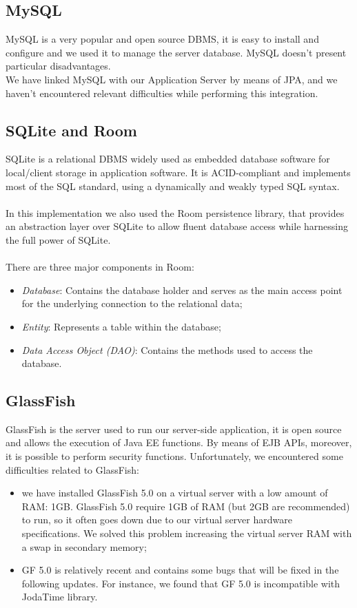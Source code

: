 \subsection{MySQL}
\label{subsec:Middleware}
MySQL is a very popular and open source DBMS, it is easy to install and configure and we used it to manage the server database. MySQL doesn't present particular disadvantages.\\
We have linked MySQL with our Application Server by means of JPA, and we haven't encountered relevant difficulties while performing this integration.

\subsection{SQLite and Room}
\label{subsec:SQLite and Room}
SQLite is a relational DBMS widely used as embedded database software for local/client storage in application software. It is ACID-compliant and implements most of the SQL standard, using a dynamically and weakly typed SQL syntax. \\\\
In this implementation we also used the Room persistence library, that provides an abstraction layer over SQLite to allow fluent database access while harnessing the full power of SQLite. \\\\
There are three major components in Room:
\begin{itemize}
\item \textit{Database}: Contains the database holder and serves as the main access point for the underlying connection to the relational data;
\item \textit{Entity}: Represents a table within the database;
\item \textit{Data Access Object (DAO)}: Contains the methods used to access the database.
\end{itemize}

\subsection{GlassFish}
\label{subsec:GlassFish}
GlassFish is the server used to run our server-side application, it is open source and allows the execution of Java EE functions. By means of EJB APIs, moreover, it is possible to perform security functions. Unfortunately, we encountered some difficulties related to GlassFish:
\begin{itemize}
\item we have installed GlassFish 5.0 on a virtual server with a low amount of RAM: 1GB. GlassFish 5.0 require 1GB of RAM (but 2GB are recommended) to run, so it often goes down due to our virtual server hardware specifications. We solved this problem increasing the virtual server RAM with a swap in secondary memory;
\item GF 5.0 is relatively recent and contains some bugs that will be fixed in the following updates. For instance, we found that GF 5.0 is incompatible with JodaTime library.
\end{itemize}